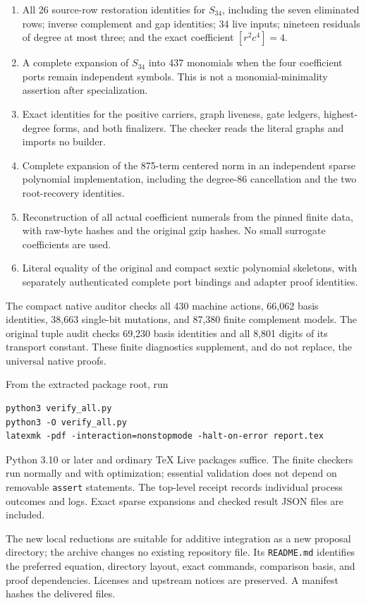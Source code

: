 \documentclass[11pt,a4paper]{article}
\theoremstyle{definition}
\newcommand{\src}[1]{{\urlstyle{tt}\nolinkurl{#1}}}
\begin{document}
\begin{enumerate}
\item All 26 source-row restoration identities for \(S_{34}\),
including the seven eliminated rows; inverse complement and
gap identities; 34 live inputs; nineteen residuals of degree
at most three; and the exact coefficient \([r^2c^4]=4\).
\item A complete expansion of \(S_{34}\) into 437 monomials
when the four coefficient ports remain independent symbols.
This is not a monomial-minimality assertion after specialization.
\item Exact identities for the positive carriers, graph liveness,
gate ledgers, highest-degree forms, and both finalizers.
The checker reads the literal graphs and imports no builder.
\item Complete expansion of the 875-term centered norm in an
independent sparse polynomial implementation, including the
degree-86 cancellation and the two root-recovery identities.
\item Reconstruction of all actual coefficient numerals from
the pinned finite data, with raw-byte hashes and the original
gzip hashes. No small surrogate coefficients are used.
\item Literal equality of the original and compact sextic
polynomial skeletons, with separately authenticated complete
port bindings and adapter proof identities.
\end{enumerate}

The compact native auditor checks all 430 machine actions,
66,062 basis identities, 38,663 single-bit mutations,
and 87,380 finite complement models. The original tuple
audit checks 69,230 basis identities and all 8,801 digits of
its transport constant. These finite diagnostics supplement,
and do not replace, the universal native proofs.

From the extracted package root, run
\begin{lstlisting}
python3 verify_all.py
python3 -O verify_all.py
latexmk -pdf -interaction=nonstopmode -halt-on-error report.tex
\end{lstlisting}
Python 3.10 or later and ordinary TeX Live packages suffice.
The finite checkers run normally and with optimization;
essential validation does not depend on removable
\src{assert} statements. The top-level receipt records
individual process outcomes and logs. Exact sparse
expansions and checked result JSON files are included.

The new local reductions are suitable for additive integration
as a new proposal directory; the archive changes no existing
repository file. Its \src{README.md} identifies the preferred
equation, directory layout, exact commands, comparison basis,
and proof dependencies. Licenses and upstream notices are
preserved. A manifest hashes the delivered files.
\end{document}
